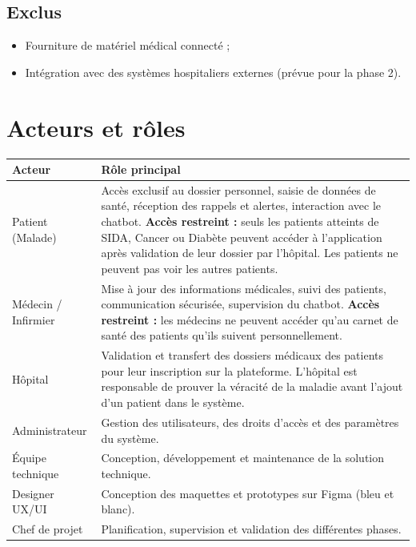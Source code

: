 ﻿\documentclass[12pt,a4paper]{report}
\begin{document}
\subsection*{Exclus}  
\begin{itemize}
    \item Fourniture de matériel médical connecté ;
    \item Intégration avec des systèmes hospitaliers externes (prévue pour la phase 2).
\end{itemize}

\newpage  
\section*{Acteurs et rôles}  

\begin{longtable}{|p{5cm}|p{10cm}|}  
\hline  
\textbf{Acteur} & \textbf{Rôle principal} \\  
\hline  
Patient (Malade) & Accès exclusif au dossier personnel, saisie de données de santé, réception des rappels et alertes, interaction avec le chatbot. \textbf{Accès restreint :} seuls les patients atteints de SIDA, Cancer ou Diabète peuvent accéder à l'application après validation de leur dossier par l'hôpital. Les patients ne peuvent pas voir les autres patients. \\  
\hline  
Médecin / Infirmier & Mise à jour des informations médicales, suivi des patients, communication sécurisée, supervision du chatbot. \textbf{Accès restreint :} les médecins ne peuvent accéder qu'au carnet de santé des patients qu'ils suivent personnellement. \\  
\hline  
Hôpital & Validation et transfert des dossiers médicaux des patients pour leur inscription sur la plateforme. L'hôpital est responsable de prouver la véracité de la maladie avant l'ajout d'un patient dans le système. \\  
\hline  
Administrateur & Gestion des utilisateurs, des droits d'accès et des paramètres du système. \\  
\hline  
Équipe technique & Conception, développement et maintenance de la solution technique. \\  
\hline  
Designer UX/UI & Conception des maquettes et prototypes sur Figma (bleu et blanc). \\  
\hline  
Chef de projet & Planification, supervision et validation des différentes phases. \\  
\hline  
\end{longtable}  
\end{document}
